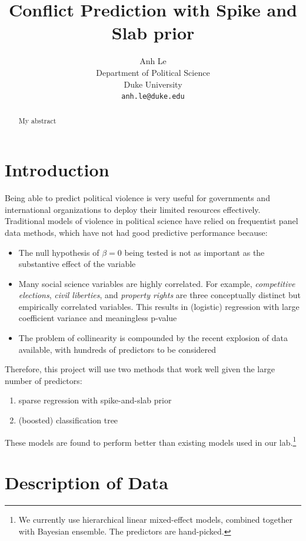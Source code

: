 \documentclass{article}
\title{Conflict Prediction with Spike and Slab prior}
\author{Anh Le\\
Department of Political Science\\
Duke University\\
\texttt{anh.le@duke.edu} \\}
\begin{document}
\maketitle

\begin{abstract}
My abstract
\end{abstract}

\section*{Introduction}

Being able to predict political violence is very useful for governments and international organizations to deploy their limited resources effectively. Traditional models of violence in political science have relied on frequentist panel data methods, which have not had good predictive performance because:
\begin{itemize}
\item The null hypothesis of $\beta = 0$ being tested is not as important as the substantive effect of the variable
\item Many social science variables are highly correlated. For example, \textit{competitive elections}, \textit{civil liberties}, and \textit{property rights} are three conceptually distinct but empirically correlated variables. This results in (logistic) regression with large coefficient variance and meaningless p-value
\item The problem of collinearity is compounded by the recent explosion of data available, with hundreds of predictors to be considered
\end{itemize}

Therefore, this project will use two methods that work well given the large number of predictors:
\begin{enumerate}
\item sparse regression with spike-and-slab prior
\item (boosted) classification tree
\end{enumerate}

These models are found to perform better than existing models used in our lab.\footnote{We currently use hierarchical linear mixed-effect models, combined together with Bayesian ensemble. The predictors are hand-picked.}

\section{Description of Data}
\end{document}

